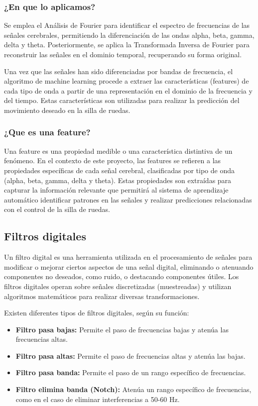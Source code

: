 \documentclass{article}
\begin{document}
\subsubsection{¿En que lo aplicamos?}

Se emplea el Análisis de Fourier para identificar el espectro de frecuencias de las señales cerebrales, permitiendo la diferenciación de las ondas alpha, beta, gamma, delta y theta. Posteriormente, se aplica la Transformada Inversa de Fourier para reconstruir las señales en el dominio temporal, recuperando su forma original.

Una vez que las señales han sido diferenciadas por bandas de frecuencia, el algoritmo de machine learning procede a extraer las características (features) de cada tipo de onda a partir de una representación en el dominio de la frecuencia y del tiempo. Estas características son utilizadas para realizar la predicción del movimiento deseado en la silla de ruedas.

\subsubsection{¿Que es una feature?}

Una feature es una propiedad medible o una característica distintiva de un fenómeno. En el contexto de este proyecto, las features se refieren a las propiedades específicas de cada señal cerebral, clasificadas por tipo de onda (alpha, beta, gamma, delta y theta). Estas propiedades son extraídas para capturar la información relevante que permitirá al sistema de aprendizaje automático identificar patrones en las señales y realizar predicciones relacionadas con el control de la silla de ruedas.

\subsection{Filtros digitales}

Un filtro digital es una herramienta utilizada en el procesamiento de señales para modificar o mejorar ciertos aspectos de una señal digital, eliminando o atenuando componentes no deseados, como ruido, o destacando componentes útiles. Los filtros digitales operan sobre señales discretizadas (muestreadas) y utilizan algoritmos matemáticos para realizar diversas transformaciones.

Existen diferentes tipos de filtros digitales, según su función:

\begin{itemize}
    \item \textbf{Filtro pasa bajas:} Permite el paso de frecuencias bajas y atenúa las frecuencias altas.
    \item \textbf{Filtro pasa altas:} Permite el paso de frecuencias altas y atenúa las bajas.
    \item \textbf{Filtro pasa banda:} Permite el paso de un rango específico de frecuencias.
    \item \textbf{Filtro elimina banda (Notch):} Atenúa un rango específico de frecuencias, como en el caso de eliminar interferencias a 50-60 Hz.
\end{itemize}
\end{document}
